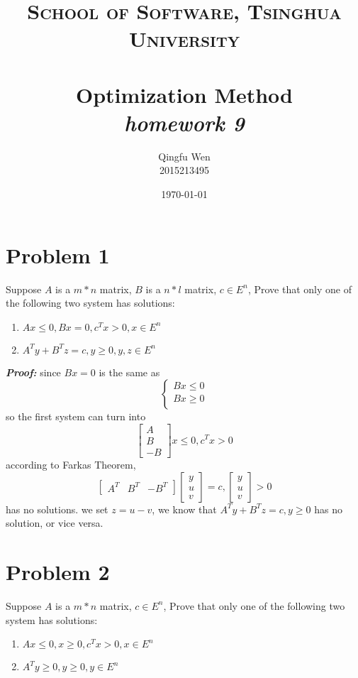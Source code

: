 \documentclass[paper=a4, fontsize=11pt]{scrartcl} %
\title{	
\normalfont \normalsize
\textsc{School of Software, Tsinghua University} \\ [25pt] %
\horrule{0.5pt} \\[0.4cm] %
\huge Optimization Method\\ %
\LARGE\textit{homework 9}
\horrule{2pt} \\[0.5cm] %
}
\author{Qingfu Wen \\ \normalsize 2015213495} %
\date{\normalsize\today} %
\numberwithin{equation}{section} %
\numberwithin{figure}{section} %
\numberwithin{table}{section} %
\begin{document}
\maketitle %
\tableofcontents
\newpage
\section{Problem 1}
Suppose $A$ is a $m*n$ matrix, $B$ is a $n*l$ matrix, $c\in E^n$, Prove that only one of the following two system has solutions:
\begin{enumerate}
\item $Ax\leq0,Bx=0,c^Tx>0, x\in E^n$
\item $A^Ty+B^Tz=c,y\geq0, y,z\in E^n$
\end{enumerate}
\emph{\textbf{Proof:}}
since $Bx=0$ is the same as
\begin{equation}
\left\{
\begin{aligned}
Bx\leq0 \\
Bx\geq0 \\
\end{aligned}
\right.\nonumber
\end{equation}
so the first system can turn into
\begin{equation} 
\begin{bmatrix}A \\ B \\ -B\end{bmatrix}x\leq0,c^Tx>0   \nonumber
\end{equation}
according to Farkas Theorem,
\begin{equation}
\begin{bmatrix}A^T & B^T & -B^T\end{bmatrix}\begin{bmatrix}y \\ u \\ v\end{bmatrix}=c, \begin{bmatrix}y \\ u \\ v\end{bmatrix}>0    \nonumber
\end{equation}
has no solutions. we set $z=u-v$, we know that $A^Ty+B^Tz=c,y\geq0$ has no solution, or vice versa.
\section{Problem 2}
Suppose $A$ is a $m*n$ matrix, $c\in E^n$, Prove that only one of the following two system has solutions:
\begin{enumerate}
\item $Ax\leq0,x\geq0,c^Tx>0, x\in E^n$
\item $A^Ty\geq0,y\geq0, y\in E^n$
\end{enumerate}
\end{document}
